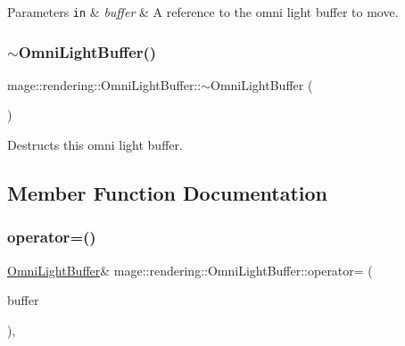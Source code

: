 \begin{DoxyParams}[1]{Parameters}
\mbox{\tt in}  & {\em buffer} & A reference to the omni light buffer to move. \\
\hline
\end{DoxyParams}
\mbox{\label{structmage_1_1rendering_1_1_omni_light_buffer_a67eee7a5d21a124ffe74cd5ae94196b6}} 
\subsubsection{\texorpdfstring{$\sim$\+Omni\+Light\+Buffer()}{~OmniLightBuffer()}}
{\footnotesize\ttfamily mage\+::rendering\+::\+Omni\+Light\+Buffer\+::$\sim$\+Omni\+Light\+Buffer (\begin{DoxyParamCaption}{ }\end{DoxyParamCaption})\hspace{0.3cm}{\ttfamily [default]}}

Destructs this omni light buffer. 

\subsection{Member Function Documentation}
\mbox{\label{structmage_1_1rendering_1_1_omni_light_buffer_a915b047abdc1068279b8308b189b60f5}} 
\subsubsection{\texorpdfstring{operator=()}{operator=()}\hspace{0.1cm}{\footnotesize\ttfamily [1/2]}}
{\footnotesize\ttfamily \mbox{\hyperlink{structmage_1_1rendering_1_1_omni_light_buffer}{Omni\+Light\+Buffer}}\& mage\+::rendering\+::\+Omni\+Light\+Buffer\+::operator= (\begin{DoxyParamCaption}\item[{const \mbox{\hyperlink{structmage_1_1rendering_1_1_omni_light_buffer}{Omni\+Light\+Buffer}} \&}]{buffer }\end{DoxyParamCaption})\hspace{0.3cm}{\ttfamily [default]}, {\ttfamily [noexcept]}}

